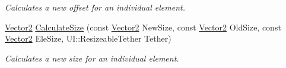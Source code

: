 \begin{DoxyCompactItemize}
\begin{DoxyCompactList}\small\item\em Calculates a new offset for an individual element. \item\end{DoxyCompactList}\item 
\hypertarget{classphys_1_1UI_1_1Window_a4d120ac244f9a9c683f8b9bdb90835a8}{
\hyperlink{classphys_1_1Vector2}{Vector2} \hyperlink{classphys_1_1UI_1_1Window_a4d120ac244f9a9c683f8b9bdb90835a8}{CalculateSize} (const \hyperlink{classphys_1_1Vector2}{Vector2} NewSize, const \hyperlink{classphys_1_1Vector2}{Vector2} OldSize, const \hyperlink{classphys_1_1Vector2}{Vector2} EleSize, UI::ResizeableTether Tether)}
\label{d4/d86/classphys_1_1UI_1_1Window_a4d120ac244f9a9c683f8b9bdb90835a8}

\begin{DoxyCompactList}\small\item\em Calculates a new size for an individual element. \item\end{DoxyCompactList}\end{DoxyCompactItemize}
